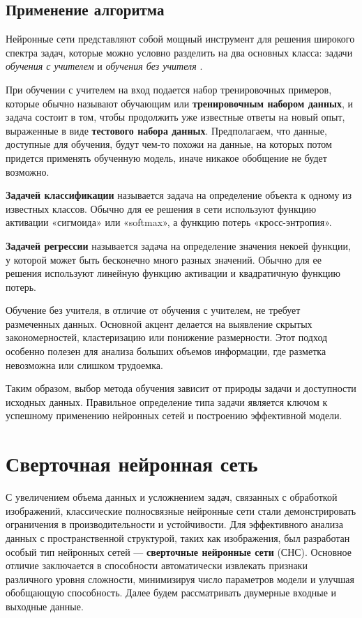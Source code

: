 \documentclass[12pt, a4paper]{article}
\begin{document}
\subsection{Применение алгоритма}

Нейронные сети представляют собой мощный инструмент для решения широкого спектра задач, которые можно условно разделить на два основных класса: задачи \textit{обучения с учителем} и \textit{обучения без учителя} \cite[c.17]{3}.

При обучении с учителем на вход подается набор тренировочных примеров, которые обычно называют обучающим или \textbf{тренировочным набором данных}, и задача состоит в том, чтобы продолжить уже известные ответы на новый опыт, выраженные в виде \textbf{тестового набора данных}. Предполагаем, что данные, доступные для обучения, будут чем-то похожи на данные, на которых потом придется применять обученную модель, иначе никакое обобщение не будет возможно.

  \textbf{Задачей классификации} называется задача на определение объекта к одному из известных классов. Обычно для ее решения в сети используют функцию активации «сигмоида» или «softmax», а функцию потерь «кросс-энтропия». 

 \textbf{Задачей регрессии} называется задача на определение значения некоей функции, у которой может быть бесконечно много разных значений. Обычно для ее решения используют линейную функцию активации и квадратичную функцию потерь.


Обучение без учителя, в отличие от обучения с учителем, не требует размеченных данных. Основной акцент делается на выявление скрытых закономерностей, кластеризацию или понижение размерности. Этот подход особенно полезен для анализа больших объемов информации, где разметка невозможна или слишком трудоемка.

Таким образом, выбор метода обучения зависит от природы задачи и доступности исходных данных. Правильное определение типа задачи является ключом к успешному применению нейронных сетей и построению эффективной модели.




 
 
 
 



\section{Сверточная нейронная сеть}
С увеличением объема данных и усложнением задач, связанных с обработкой изображений, классические полносвязные нейронные сети стали демонстрировать ограничения в производительности и устойчивости. Для эффективного анализа данных с пространственной структурой, таких как изображения, был разработан особый тип нейронных сетей — \textbf{сверточные нейронные сети} (СНС). Основное отличие заключается в способности автоматически извлекать признаки различного уровня сложности, минимизируя число параметров модели и улучшая обобщающую способность.  Далее будем рассматривать двумерные входные и выходные данные.
\end{document}

